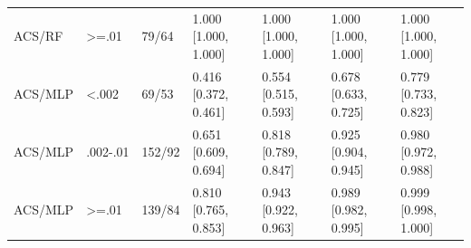 \begin{tabular}{lllllll}
ACS/RF & >=.01 & 79/64 & 1.000 [1.000, 1.000] & 1.000 [1.000, 1.000] & 1.000 [1.000, 1.000] & 1.000 [1.000, 1.000] \\
ACS/MLP & <.002 & 69/53 & 0.416 [0.372, 0.461] & 0.554 [0.515, 0.593] & 0.678 [0.633, 0.725] & 0.779 [0.733, 0.823] \\
ACS/MLP & .002-.01 & 152/92 & 0.651 [0.609, 0.694] & 0.818 [0.789, 0.847] & 0.925 [0.904, 0.945] & 0.980 [0.972, 0.988] \\
ACS/MLP & >=.01 & 139/84 & 0.810 [0.765, 0.853] & 0.943 [0.922, 0.963] & 0.989 [0.982, 0.995] & 0.999 [0.998, 1.000] \\
\bottomrule
\end{tabular}
\endgroup
